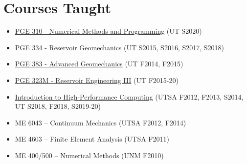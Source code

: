 \section*{Courses Taught}

  \begin{itemize}
      \item \href{https://johnfoster.pge.utexas.edu/PGE310-IntroProgramming/}{PGE 310 - Numerical Methods and Programming} (UT S2020)
      \item \href{http://johnfoster.pge.utexas.edu/PGE334-ResGeomechanics/}{PGE 334 - Reservoir Geomechanics} (UT S2015, S2016, S2017, S2018)
      \item \href{http://johnfoster.pge.utexas.edu/PGE383-AdvGeomechanics/}{PGE 383 - Advanced Geomechanics} (UT F2014, F2015)
      \item \href{http://johnfoster.pge.utexas.edu/PGE323M-ResEngineeringIII/}{PGE 323M - Reservoir Engineering III} (UT F2015-20)
      \item \href{http://johnfoster.pge.utexas.edu/HPC/}{Introduction to High-Performance Computing} (UTSA F2012, F2013, S2014, UT S2018, F2018, S2019-20)
      \item ME 6043 -- Continuum Mechanics (UTSA F2012, F2014)
      \item ME 4603 -- Finite Element Analysis (UTSA F2011)
      \item ME 400/500 -- Numerical Methods (UNM F2010)
  \end{itemize}
